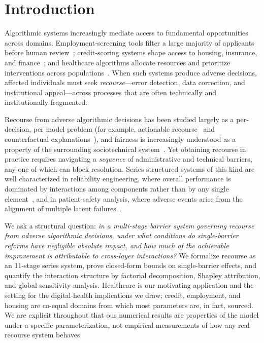 \documentclass[10pt,letterpaper]{article}
\begin{document}
\linenumbers

\section*{Introduction}
Algorithmic systems increasingly mediate access to fundamental opportunities across domains. Employment-screening tools filter a large majority of applicants before human review~\cite{bib_fuller,bib_eeoc,bib_ajunwa,bib_raghavan}; credit-scoring systems shape access to housing, insurance, and finance~\cite{bib_cfpb_credit}; and healthcare algorithms allocate resources and prioritize interventions across populations~\cite{bib_obermeyer}. When such systems produce adverse decisions, affected individuals must seek \emph{recourse}---error detection, data correction, and institutional appeal---across processes that are often technically and institutionally fragmented.

Recourse from adverse algorithmic decisions has been studied largely as a per-decision, per-model problem (for example, actionable recourse~\cite{bib_ustun} and counterfactual explanations~\cite{bib_wachter}), and fairness is increasingly understood as a property of the surrounding sociotechnical system~\cite{bib_selbst}. Yet obtaining recourse in practice requires navigating a \emph{sequence} of administrative and technical barriers, any one of which can block resolution. Series-structured systems of this kind are well characterized in reliability engineering, where overall performance is dominated by interactions among components rather than by any single element~\cite{bib_rausand,bib_billinton}, and in patient-safety analysis, where adverse events arise from the alignment of multiple latent failures~\cite{bib_reason}.

We ask a structural question: \emph{in a multi-stage barrier system governing recourse from adverse algorithmic decisions, under what conditions do single-barrier reforms have negligible absolute impact, and how much of the achievable improvement is attributable to cross-layer interactions?} We formalize recourse as an 11-stage series system, prove closed-form bounds on single-barrier effects, and quantify the interaction structure by factorial decomposition, Shapley attribution, and global sensitivity analysis. Healthcare is our motivating application and the setting for the digital-health implications we draw; credit, employment, and housing are co-equal domains from which most parameters are, in fact, sourced. We are explicit throughout that our numerical results are properties of the model under a specific parameterization, not empirical measurements of how any real recourse system behaves.
\end{document}
